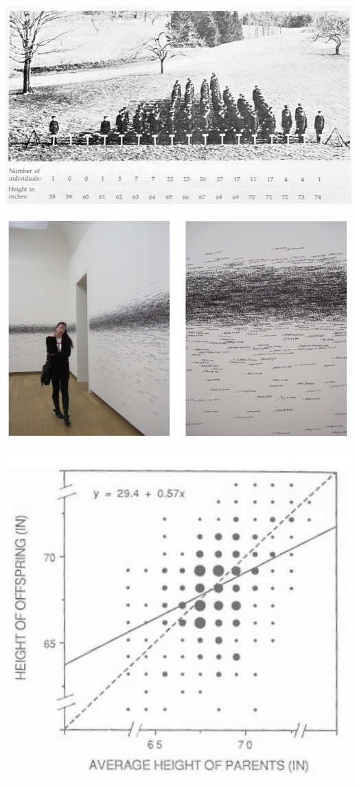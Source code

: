 \documentclass[]{book}
\begin{document}
\begin{center}\includegraphics[width=1\linewidth]{images/week_2.013} \end{center}

\begin{center}\includegraphics[width=1\linewidth]{images/week_2.015} \end{center}

\begin{center}\includegraphics[width=0.6\linewidth]{images/week_2.014} \end{center}
\end{document}
